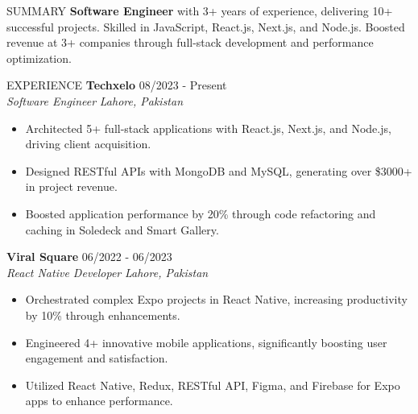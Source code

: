 \documentclass{resume}
\begin{document}
\begin{rSection}{SUMMARY}
\textbf{Software Engineer} with 3+ years of experience, delivering 10+ successful projects. Skilled in JavaScript, React.js, Next.js, and Node.js. Boosted revenue at 3+ companies through full-stack development and performance optimization.
\end{rSection}
\begin{rSection}{EXPERIENCE}
\textbf{Techxelo} \hfill 08/2023 - Present \\
\textit{Software Engineer}  \hfill \textit{Lahore, Pakistan}
\begin{itemize}
\itemsep -3pt {}
\item Architected 5+ full-stack applications with React.js, Next.js, and Node.js, driving client acquisition.
\item Designed RESTful APIs with MongoDB and MySQL, generating over \$3000+ in project revenue.
\item Boosted application performance by 20\% through code refactoring and caching in Soledeck and Smart Gallery.
\end{itemize}
\textbf{Viral Square} \hfill 06/2022 - 06/2023 \\
\textit{React Native Developer} \hfill \textit{Lahore, Pakistan}
\begin{itemize}
\itemsep -3pt {}
\item Orchestrated complex Expo projects in React Native, increasing productivity by 10\% through enhancements.
\item Engineered 4+ innovative mobile applications, significantly boosting user engagement and satisfaction.
\item Utilized React Native, Redux, RESTful API, Figma, and Firebase for Expo apps to enhance performance.
\end{itemize}
\end{rSection}
\end{document}
